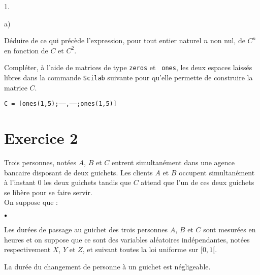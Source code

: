 \documentclass[11pt]{article}%
\begin{document}
\begin{noliste}{1.}
\begin{noliste}{a)}
\item Déduire de ce qui précède l'expression, pour tout entier naturel
$n$ non nul, de $C^{n}$	en fonction de $C$ et $C^{2}$.
\end{noliste}

 \item Compléter, à l'aide de matrices de type {\tt zeros} et {\tt
ones}, les deux espaces laissés libres dans la commande \texttt{Scilab}
suivante pour qu'elle permette de construire la matrice $C$.
 
\begin{center}
{\tt C = [ones(1,5);------,------;ones(1,5)]}
\end{center}


\end{noliste}








\section*{Exercice 2}

\noindent Trois personnes, notées $A$, $B$ et $C$ entrent simultanément
dans une agence bancaire disposant de deux guichets. Les clients $A$ et
$B$ occupent simultanément à l'instant 0 les deux guichets tandis que
$C$ attend que l'un de ces deux guichets se libère pour se faire
servir. \\
\noindent On suppose que :

\begin{noliste}{$\scriptstyle \bullet$}
\item Les durées de passage au guichet des trois personnes $A$, $B$ et
$C$ sont mesurées en heures et on suppose que ce sont des variables
aléatoires indépendantes, notées respectivement $X$, $Y$ et $Z$, et
suivant toutes la loi uniforme sur $[0, 1[$.

\item La durée du changement de personne à un guichet est négligeable.
\end{noliste}
\end{document}
